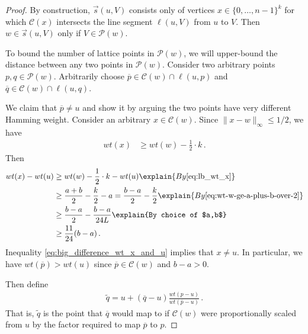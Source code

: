 \documentclass[11pt]{article}
\begin{document}
\begin{proof}
  By construction, $\vec{s}(u, V)$ consists only  of vertices $x \in \{0,\ldots, n-1\}^k$ for which $\mathcal{C}(x)$ intersects the line segment $\ell(u,V)$ from $u$ to $V$. Then   $w \in \vec{s}(u, V)$ only if $V \in \mathcal{P}(w)$.

    To bound the number of lattice points in $\mathcal{P}(w)$, we will upper-bound the distance between any two points in $\mathcal{P}(w)$. Consider two arbitrary points $p, q \in \mathcal{P}(w)$. Arbitrarily choose $\overline{p} \in \mathcal{C}(w) \cap \ell(u, p)$ and $\overline{q} \in \mathcal{C}(w) \cap \ell(u, q)$.

    We claim that $\overline{p} \neq u$ and show it by arguing the two points have very different Hamming weight. Consider an arbitrary $x \in \mathcal{C}(w)$. Since $\|x-w\|_{\infty} \leq 1/2$, we have 
\begin{align} \label{eq:lb_wt_x}
wt(x)  &\geq wt(w) - \frac{1}{2} \cdot k \,.
\end{align}
    Then 
    \begin{align} 
        wt(x) - wt(u) &\geq wt(w) - \frac{1}{2} \cdot k - wt(u) \explain{By \eqref{eq:lb_wt_x}}  \\
        &\geq \frac{a+b}{2} - \frac{k}{2} - a = \frac{b-a}{2} - \frac{k}{2}\explain{By \eqref{eq:wt-w-ge-a-plus-b-over-2}} \\
        &\geq \frac{b-a}{2} - \frac{b-a}{24L} \explain{By choice of $a,b$} \notag \\
        &\geq \frac{11}{24}(b-a) \,. \label{eq:big_difference_wt_x_and_u}
    \end{align}
Inequality \eqref{eq:big_difference_wt_x_and_u} implies that $x \neq u$. In particular, we have $wt(\overline{p}) > wt(u)$ since $\overline{p} \in \mathcal{C}(w)$ and $b-a > 0$.

    Then define
    \begin{align}\label{eq:q-tilde-in-terms-of-pbar}
        \widetilde{q} = u + (\overline{q} - u) \frac{wt(p - u)}{wt(\overline{p} - u)}\,.
    \end{align}
    That is, $\widetilde{q}$ is the point that $\overline{q}$ would map to if  $\mathcal{C}(w)$ were proportionally scaled from $u$ by the factor required to map $\overline{p}$ to $p$.


\end{proof}
\end{document}
